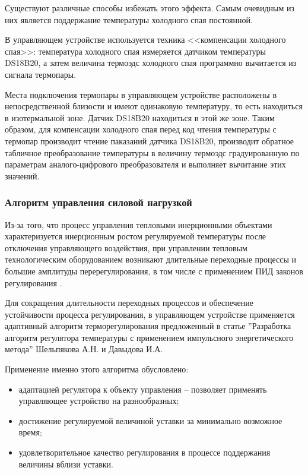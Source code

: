 Существуют различные способы избежать этого эффекта. Самым очевидным из них является поддержание
температуры холодного спая постоянной.

В управляющем устройстве используется техника <<компенсации холодного спая>>: температура холодного спая
измеряется датчиком температуры DS18B20, а затем величина термоэдс холодного спая программно
вычитается из сигнала термопары.

Места подключения термопары в управляющем устройстве расположены в непосредственной близости и имеют одинаковую
температуру, то есть находиться в изотермальной зоне. Датчик DS18B20 находиться в этой же зоне. Таким образом,
для компенсации холодного спая перед код чтения температуры с термопар производит чтение паказаний датчика DS18B20,
производит обратное табличное преобразование температуры в величину термоэдс градуированную по параметрам
аналого-цифрового преобразователя и выполняет вычитание этих значений.

\subsubsection{Алгоритм управления силовой нагрузкой}
Из-за того, что процесс управления тепловыми инерционными объектами характеризуется инерционным ростом
регулируемой температуры после отключения управляющего воздействия, при управлении тепловым
технологическим оборудованием возникают длительные переходные процессы и
большие амплитуды перерегулирования, в том числе с применением ПИД законов регулирования \cite{pwmbook}.

Для сокращения длительности переходных процессов и обеспечение устойчивости процесса регулирования,
в управляющем устройстве применяется адаптивный алгоритм терморегулирования предложенный в
статье ''Разработка алгоритм регулятора температуры с применением импульсного энергетического метода''
Шельпякова А.Н. и Давыдова И.А.

Применение именно этого алгоритма обусловлено:
\begin{itemize}
	\item адаптацией регулятора к объекту управления -- позволяет применять управляющее устройство
		на разнообразных;
	\item достижение регулируемой величиной уставки за минимально возможное время;
	\item удовлетворительное качество регулирования в процессе поддержания величины вблизи уставки.
\end{itemize}

